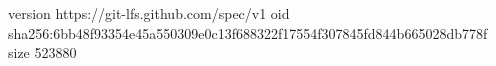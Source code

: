 version https://git-lfs.github.com/spec/v1
oid sha256:6bb48f93354e45a550309e0c13f688322f17554f307845fd844b665028db778f
size 523880

